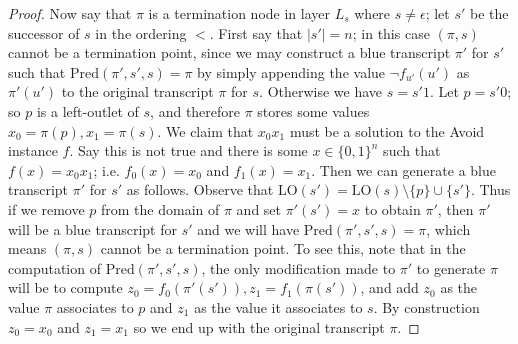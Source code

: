 \documentclass[11pt]{article}
\newcommand{\B}{\{0,1\}}
\begin{document}
\begin{proof}
Now say that $\pi$ is a termination node in layer $L_s$ where $s \neq \epsilon$; let $s'$ be the successor of $s$ in the ordering $<$. First say that $|s'|=n$; in this case $(\pi, s)$ cannot be a termination point, since we may construct a blue transcript $\pi'$ for $s'$ such that $\mathrm{Pred}(\pi',s',s)=\pi$ by simply appending the value $\lnot f_{u'}(u')$ as $\pi'(u')$ to the original transcript $\pi$ for $s$. Otherwise we have $s=s'1$. Let $p=s'0$; so $p$ is a left-outlet of $s$, and therefore $\pi$ stores some values $x_0 = \pi(p), x_1 = \pi(s)$. We claim that $x_0x_1$ must be a solution to the Avoid instance $f$. Say this is not true and there is some $x \in \B^n$ such that $f(x)=x_0x_1$; i.e. $f_0(x)=x_0$ and $f_1(x)=x_1$. Then we can generate a blue transcript $\pi'$ for $s'$ as follows. Observe that $\mathrm{LO}(s') = \mathrm{LO}(s) \setminus \{p\} \cup \{s'\}$. Thus if we remove $p$ from the domain of $\pi$ and set $\pi'(s') = x$ to obtain $\pi'$, then $\pi'$ will be a blue transcript for $s'$ and we will have $\mathrm{Pred}(\pi',s',s)=\pi$, which means $(\pi, s)$ cannot be a termination point. To see this, note that in the computation of $\mathrm{Pred}(\pi',s',s)$, the only modification made to $\pi'$ to generate $\pi$ will be to compute $z_0 =f_0(\pi'(s')), z_1 = f_1(\pi(s'))$, and add $z_0$ as the value $\pi$ associates to $p$ and $z_1$ as the value it associates to $s$. By construction $z_0 = x_0$ and $z_1=x_1$ so we end up with the original transcript $\pi$.

\end{proof}
\end{document}
